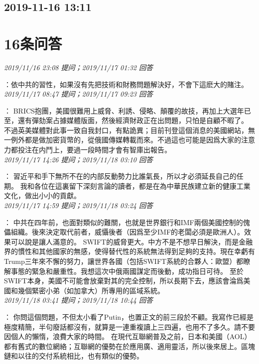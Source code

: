 \documentclass[twocolumn]{ctexart}
\begin{document}
\subsection{2019-11-16 13:11}


\section{16条问答}

\textit{\hfill\noindent\small 2019/11/16 23:08 提问；2019/11/17 01:32 回答}

：依中共的習性，如果沒有先把技術和財務問題解決好，不會下這麽大的賭注。
\\

\textit{\hfill\noindent\small 2019/11/17 08:47 提问；2019/11/17 09:23 回答}

：
BRICS抱團，美國很難用上威脅、利誘、侵略、顛覆的故技，再加上大選年已至，還有彈劾案占據媒體版面，然後經濟財政正在出問題，只怕是自顧不暇了。 
不過英美媒體對此事一致自我封口，有點詭異；目前刊登這個消息的美國網站，無一例外都是做加密貨幣的，從俄國傳媒轉載而來。不過這也可能是因爲大家的注意力都投注在内鬥上，要過一段時間才會有智庫出報告。
\\

\textit{\hfill\noindent\small 2019/11/17 14:26 提问；2019/11/18 03:10 回答}

：
習近平和手下無所不在的内部反動勢力比誰氣長，所以才必須延長自己的任期。
我和各位在這裏留下深刻言論的讀者，都是在為中華民族建立新的健康工業文化，做出小小的貢獻。
\\

\textit{\hfill\noindent\small 2019/11/17 14:59 提问；2019/11/18 03:24 回答}

：
中共在四年前，也面對類似的難關，也就是世界銀行和IMF兩個美國控制的傀儡組織。後來決定取代前者，威懾後者（因爲至少IMF的老闆必須是歐洲人）。效果可以說是讓人滿意的。 
SWIFT的威脅更大。中方不是不想早日解決，而是金融界的慣性和其他國家的無感，使得替代性的系統無法得到足夠的支持。現在幸虧有Trump三年來不懈的努力，讓世界各國（包括SWIFT系統的合夥人：歐盟）都瞭解事態的緊急和嚴重性。我想這次中俄兩國謀定而後動，成功指日可待。 
至於SWIFT本身，美國不可能會放棄對其的完全控制，所以長期下去，應該會淪爲美國和幾個緊密小弟（如加拿大）所專用的區域系統。
\\

\textit{\hfill\noindent\small 2019/11/18 03:41 提问；2019/11/18 10:44 回答}

：
你問這個問題，不但太小看了Putin，也置正文的前三段於不顧。我寫作已經是極度精簡，半句廢話都沒有，就算是一連重複讀上三四遍，也用不了多久。請不要因個人的懶惰，浪費大家的時間。 
在現代互聯網普及之前，日本和美國（AOL）都有舊式的數位網絡；互聯網的優勢在於應用廣、適用靈活，所以後來居上。區塊鏈和以往的交付系統相比，也有類似的優勢。
\\
\end{document}

